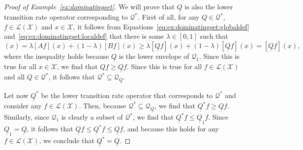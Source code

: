 \documentclass[10pt,a4paper]{paper}
\theoremstyle{definition}
\newcommand{\states}{\mathcal{X}}
\newcommand{\gambles}{\mathcal{L}}
\newcommand{\gamblesX}{\gambles(\states)}
\newcommand{\rateset}{\mathcal{Q}}
\newcommand{\lrate}{\underline{Q}}
\begin{document}
\begin{proof}[Proof of Example~\ref{ex:dominatingset}]
We will prove that $\lrate$ is also the lower transition rate operator corresponding to $\rateset^*$. First of all, for any $Q\in\rateset^*$, $f\in\gamblesX$ and $x\in\states$, it follows from Equations~\eqref{eq:ex:dominatingset:globaldef} and~\eqref{eq:ex:dominatingset:localdef} that there is some $\lambda\in[0,1]$ such that
\begin{equation*}
[Qf](x)=\lambda[Af](x)+(1-\lambda)[Bf](x)
\geq\lambda[\lrate f](x)+(1-\lambda)[\lrate f](x)
=[\lrate f](x),
\end{equation*}
where the inequality holds because $\lrate$ is the lower envelope of $\rateset_1$. Since this is true for all $x\in\states$, we find that $Qf\geq\lrate f$. Since this is true for all $f\in\gamblesX$ and all $Q\in\rateset^*$, it follows that $\rateset^*\subseteq\rateset_{\lrate}$. 


Let now $\lrate^*$ be the lower transition rate operator that corresponds to $\rateset^*$ and consider any $f\in\gamblesX$. Then, because $\rateset^*\subseteq\rateset_{\lrate}$, we find that $\lrate^*f\geq\lrate f$. Similarly, since $\rateset_1$ is clearly a subset of $\rateset^*$, we find that $\lrate^*f\leq\lrate_1f$. Since $\lrate_1=\lrate$, it follows that $\lrate f\leq \lrate^*f\leq \lrate f$, and because this holds for any $f\in\gamblesX$, we conclude that $\lrate^*=\lrate$.
\end{proof}
\end{document}
